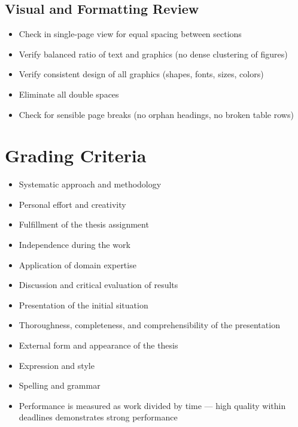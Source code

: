 \subsection{Visual and Formatting Review}
\begin{itemize}
    \item Check in single-page view for equal spacing between sections
    \item Verify balanced ratio of text and graphics (no dense clustering of figures)
    \item Verify consistent design of all graphics (shapes, fonts, sizes, colors)
    \item Eliminate all double spaces
    \item Check for sensible page breaks (no orphan headings, no broken table rows)
\end{itemize}


\section{Grading Criteria}

\begin{itemize}
    \item Systematic approach and methodology
    \item Personal effort and creativity
    \item Fulfillment of the thesis assignment
    \item Independence during the work
    \item Application of domain expertise
    \item Discussion and critical evaluation of results
    \item Presentation of the initial situation
    \item Thoroughness, completeness, and comprehensibility of the presentation
    \item External form and appearance of the thesis
    \item Expression and style
    \item Spelling and grammar
    \item Performance is measured as work divided by time --- high quality within deadlines demonstrates strong performance
\end{itemize}


